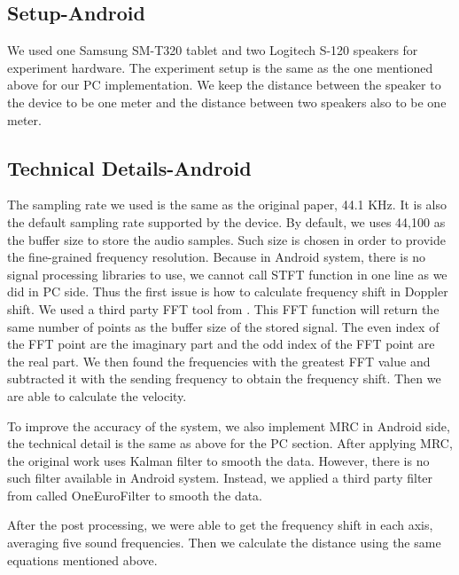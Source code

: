 \documentclass{acm_proc_article-sp}
\begin{document}
\subsection{Setup-Android}
We used one Samsung SM-T320 tablet and two Logitech S-120 speakers for experiment 
hardware. The experiment setup is the same as the one mentioned above for our PC 
implementation. We keep the distance between the speaker to the device to be one meter
and the distance between two speakers also to be one meter. 

\subsection{Technical Details-Android}
The sampling rate we used is the same as the original paper, 44.1 KHz. It is also the 
default sampling rate supported by the device. By default, we uses 44,100 as the buffer
size to store the audio samples. Such size is chosen in order to provide the fine-grained
frequency resolution.
Because in Android system, there is no signal processing libraries to use, we cannot 
call STFT function in one line as we did in PC side. Thus the first issue is how to 
calculate frequency shift in Doppler shift. We used a third party FFT tool from 
\cite{FFT}. This FFT function will return the same number of points as the buffer size
of the stored signal. The even index of the FFT point are the imaginary part and the odd 
index of the FFT point are the real part. We then found the frequencies with the greatest
FFT value and subtracted it with the sending frequency to obtain the frequency shift. 
Then we are able to calculate the velocity. 

To improve the accuracy of the system, we also implement MRC in Android side, the 
technical detail is the same as above for the PC section. After applying MRC, the original
work uses Kalman filter to smooth the data. However, there is no such filter available in
Android system. Instead, we applied a third party filter from
\cite{SignalFilter} called OneEuroFilter to smooth the data.

After the post processing, we were able to get the frequency shift in each axis, averaging
five sound frequencies. Then we calculate the distance using the same equations mentioned
above.
\end{document}
